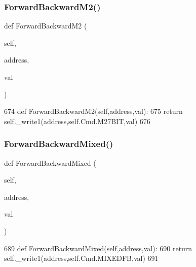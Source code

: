 \subsubsection{\texorpdfstring{Forward\+Backward\+M2()}{ForwardBackwardM2()}}
{\footnotesize\ttfamily def Forward\+Backward\+M2 (\begin{DoxyParamCaption}\item[{}]{self,  }\item[{}]{address,  }\item[{}]{val }\end{DoxyParamCaption})}


\begin{DoxyCode}
674     \textcolor{keyword}{def }ForwardBackwardM2(self,address,val):
675         \textcolor{keywordflow}{return} self.\_write1(address,self.Cmd.M27BIT,val)
676 
\end{DoxyCode}
\mbox{\label{classtoxic__hardware_1_1roboclaw__3_1_1Roboclaw_a1895e1f56aaf7909852db2e576f59d2d}} 
\subsubsection{\texorpdfstring{Forward\+Backward\+Mixed()}{ForwardBackwardMixed()}}
{\footnotesize\ttfamily def Forward\+Backward\+Mixed (\begin{DoxyParamCaption}\item[{}]{self,  }\item[{}]{address,  }\item[{}]{val }\end{DoxyParamCaption})}


\begin{DoxyCode}
689     \textcolor{keyword}{def }ForwardBackwardMixed(self,address,val):
690         \textcolor{keywordflow}{return} self.\_write1(address,self.Cmd.MIXEDFB,val)
691 
\end{DoxyCode}
\mbox{\label{classtoxic__hardware_1_1roboclaw__3_1_1Roboclaw_adf9ab5d77d53912be9929f7ed8e6e05f}} 
